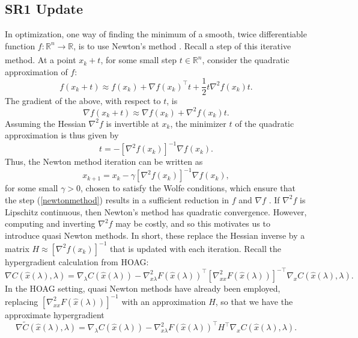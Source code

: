 \documentclass[11pt, twoside]{report}
\begin{document}
\subsection{SR1 Update}
\label{section:sr1}
In optimization, one way of finding the minimum of a smooth, twice differentiable function $f: \mathbb{R}^n \xrightarrow[]{} \mathbb{R}$, is to use Newton's method \cite{nocedal2006numerical}. Recall a step of this iterative method. At a point $x_k + t$, for some small step $t \in \mathbb{R}^n$, consider the quadratic approximation of $f$:
\[f(x_k + t) \approx f(x_k) + \nabla f(x_k)^\top t + \frac{1}{2}t \nabla^2 f(x_k) t.\]
The gradient of the above, with respect to $t$, is
\[\nabla f(x_k + t) \approx \nabla f(x_k) + \nabla^2 f(x_k) t.\]
Assuming the Hessian $\nabla^2 f$ is invertible at $x_k$, the minimizer $t$ of the quadratic approximation is thus given by
\[t = -[\nabla^2 f(x_k)]^{-1} \nabla f(x_k).\]
Thus, the Newton method iteration can be written as 
\begin{equation} \label{newtonmethod}
    x_{k+1} = x_k - \gamma [\nabla^2 f(x_k)]^{-1} \nabla f(x_k),
\end{equation}
for some small $\gamma > 0$, chosen to satisfy the Wolfe conditions, which ensure that the step (\ref{newtonmethod}) results in a sufficient reduction in $f$ and $\nabla f$ \cite{nocedal2006numerical}. If $\nabla^2 f$ is Lipschitz continuous, then Newton's method has quadratic convergence\cite{nocedal2006numerical}. However, computing and inverting $\nabla^2 f$ may be costly, and so this motivates us to introduce quasi Newton methods. In short, these replace the Hessian inverse by a matrix $H \approx [\nabla^2 f(x_k)]^{-1}$ that is updated with each iteration. Recall the hypergradient calculation from HOAG:
\[\nabla C(\hat{x}(\lambda), \lambda) = \nabla_\lambda C(\hat{x}(\lambda)) - \nabla^2_{x \lambda} F(\hat{x}(\lambda))^\top \left[ \nabla^2_{xx} F(\hat{x}(\lambda)) \right]^{-\top} \nabla_x C(\hat{x}(\lambda), \lambda).\]
In the HOAG setting, quasi Newton methods have already been employed, replacing $\left[ \nabla^2_{xx} F(\hat{x}(\lambda)) \right]^{-1}$ with an approximation $H$, so that we have the approximate hypergradient
\[\nabla \tilde{C}(\hat{x}(\lambda), \lambda) = \nabla_\lambda C(\hat{x}(\lambda)) - \nabla^2_{x \lambda} F(\hat{x}(\lambda))^\top H^\top \nabla_x C(\hat{x}(\lambda), \lambda).\]
\end{document}
